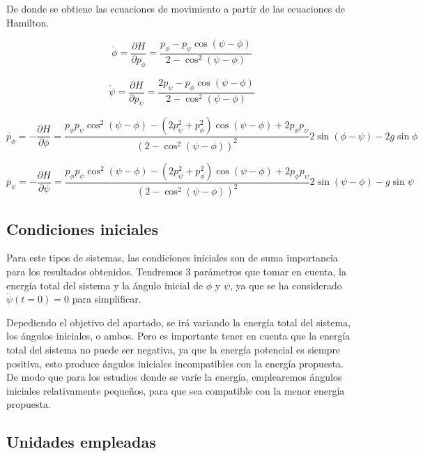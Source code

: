 \documentclass[11pt, twoside]{article} %
\begin{document}
De donde se obtiene las ecuaciones de movimiento a partir de las 
ecuaciones de Hamilton.

\begin{equation}
        \dot{\phi} = \frac{\partial H}{\partial p_\phi} = \frac{p_\phi - p_\psi\cos(\psi - \phi)}{2-\cos^2(\psi - \phi)} 
\end{equation}

\begin{equation}
    \dot{\psi} = \frac{\partial H}{\partial p_\psi} = \frac{2p_\psi - p_\phi\cos(\psi - \phi)}{2-\cos^2(\psi - \phi)}
\end{equation}

\begin{equation}
    \dot{p_\phi} = -\frac{\partial H}{\partial \phi} =  \frac{p_\phi p_\psi \cos^2(\psi - \phi) - (2p_\psi^2 + p_\phi^2)\cos(\psi - \phi) + 2p_\phi p_\psi }{(2-\cos^2(\psi - \phi))^2}2\sin(\phi - \psi) -2g\sin\phi
\end{equation}

\begin{equation}
    \dot{p_\psi} = -\frac{\partial H}{\partial \psi} =  \frac{p_\phi p_\psi \cos^2(\psi - \phi) - (2p_\psi^2 + p_\phi^2)\cos(\psi - \phi) + 2p_\phi p_\psi }{(2-\cos^2(\psi - \phi))^2}2\sin(\psi - \phi) -g\sin\psi
\end{equation}

\subsection{Condiciones iniciales}

Para este tipos de sistemas, las condiciones iniciales son de suma 
importancia para los resultados obtenidos. Tendremos 3 parámetros que tomar
en cuenta, la energía total del sistema y la ángulo inicial de $\phi$ y
$\psi$, ya que se ha considerado $\dot{\psi} (t=0) = 0$ para simplificar.

Depediendo el objetivo del apartado, se irá variando la energía total 
del sistema, los ángulos iniciales, o ambos. Pero es importante tener en
cuenta que la energía total del sistema no puede ser negativa, ya que
la energía potencial es siempre positiva, esto produce ángulos iniciales
incompatibles con la energía propuesta. De modo que para los estudios donde
se varíe la energía, emplearemos ángulos iniciales relativamente pequeños, 
para que sea compatible con la menor energía propuesta.

\subsection{Unidades empleadas}
\end{document}
